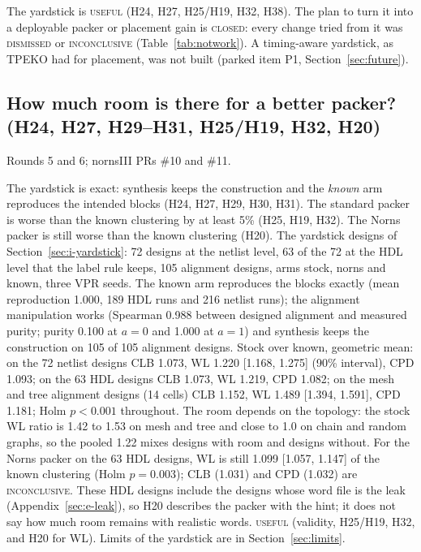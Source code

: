  The yardstick is \textsc{useful} (H24, H27, H25/H19, H32, H38). The plan to turn it into a deployable packer or placement gain is \textsc{closed}: every change tried from it was \textsc{dismissed} or \textsc{inconclusive} (Table~\ref{tab:notwork}). A timing-aware yardstick, as TPEKO had for placement, was not built (parked item P1, Section~\ref{sec:future}).

\subsection{How much room is there for a better packer? (H24, H27, H29--H31, H25/H19, H32, H20)}
\label{sec:e-room}

 Rounds 5 and 6; nornsIII PRs \#10 and \#11.

 The yardstick is exact: synthesis keeps the construction and the \emph{known} arm reproduces the intended blocks (H24, H27, H29, H30, H31). The standard packer is worse than the known clustering by at least 5\% (H25, H19, H32). The Norns packer is still worse than the known clustering (H20).
 The yardstick designs of Section~\ref{sec:i-yardstick}: 72 designs at the netlist level, 63 of the 72 at the HDL level that the label rule keeps, 105 alignment designs, arms stock, norns and known, three VPR seeds.
 The known arm reproduces the blocks exactly (mean reproduction 1.000, 189 HDL runs and 216 netlist runs); the alignment manipulation works (Spearman 0.988 between designed alignment and measured purity; purity 0.100 at $a=0$ and 1.000 at $a=1$) and synthesis keeps the construction on 105 of 105 alignment designs. %
Stock over known, geometric mean: on the 72 netlist designs CLB 1.073, WL 1.220 [1.168, 1.275] (90\% interval), CPD 1.093; on the 63 HDL designs CLB 1.073, WL 1.219, CPD 1.082; on the mesh and tree alignment designs (14 cells) CLB 1.152, WL 1.489 [1.394, 1.591], CPD 1.181; Holm $p<0.001$ throughout. %
The room depends on the topology: the stock WL ratio is 1.42 to 1.53 on mesh and tree and close to 1.0 on chain and random graphs, so the pooled 1.22 mixes designs with room and designs without. %
For the Norns packer on the 63 HDL designs, WL is still 1.099 [1.057, 1.147] of the known clustering (Holm $p=0.003$); CLB (1.031) and CPD (1.032) are \textsc{inconclusive}. %
These HDL designs include the  designs whose word file is the leak (Appendix~\ref{sec:e-leak}), so H20 describes the packer with the hint; it does not say how much room remains with realistic words.
 \textsc{useful} (validity, H25/H19, H32, and H20 for WL). Limits of the yardstick are in Section~\ref{sec:limits}.


